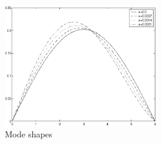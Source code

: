 \documentclass[11pt]{book}
\begin{document}
\begin{center}
\begin{figure}[h]
		\centering
		\includegraphics[width=0.6\textwidth]{modes}
		\caption{Mode shapes}
		\label{fig:modes}
\end{figure}
\end{center}




 
\end{document}

